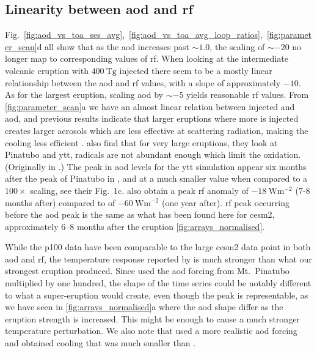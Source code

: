 \documentclass{ametsocV6.1}
\newcommand{\iso}[1][i]{{#1}njected \ce{SO2}}
\begin{document}
\subsection{Linearity between \gls{aod} and \gls{rf}}

Fig.~\ref{fig:aod_vs_toa_ses_avg},~\ref{fig:aod_vs_toa_avg_loop_ratios},~\ref{fig:parameter_scan}d
all show that as the \gls{aod} increases past \(\sim 1.0\), the scaling of \(\sim -20\)
no longer map to corresponding values of \gls{rf}. When looking at the intermediate
volcanic eruption with \(\SI{400}{\tera\gram}\) \iso{} there seem to be a mostly linear
relationship between the \gls{aod} and \gls{rf} values, with a slope of approximately
\(-10\). As for the largest eruption, scaling \gls{aod} by \(\sim-5\) yields reasonable
\gls{rf} values. From \ref{fig:parameter_scan}a we have an almost linear relation
between \iso{} and \gls{aod}, and previous results indicate that larger eruptions where
more  is injected creates larger aerosols which are less effective at scattering
radiation, making the cooling less efficient
\citep{english2013,timmreck2010,timmreck2018}. \citet{timmreck2010} also find that for
very large eruptions, they look at Pinatubo and \gls{ytt},  radicals are not
abundant enough which limit the  oxidation. (Originally in \citep{bekki1995}.)
The peak in \gls{aod} levels for the \gls{ytt} simulation appear six months after the
peak of Pinatubo in \citet{timmreck2010}, and at a much smaller value when compared to a
\(100\times\) scaling, see their Fig.\ 1c. \citet{timmreck2010} also obtain a peak
\gls{rf} anomaly of \(\SI{-18}{\watt\metre^{-2}}\) (\(7\)-\(8\) months after) compared
to \citet{jones2005} of \(\SI{-60}{\watt\metre^{-2}}\) (one year after). \gls{rf} peak
occurring before the \gls{aod} peak is the same as what has been found here for
\gls{cesm2}, approximately \(6\)--\(8\) months after the eruption
\ref{fig:arrays_normalised}.

While the \gls{p100} data have been comparable to the large \gls{cesm2} data point in
both \gls{aod} and \gls{rf}, the temperature response reported by \citet{jones2005} is
much stronger than what our strongest eruption produced. Since \citet{jones2005} used
the \gls{aod} forcing from Mt.\ Pinatubo multiplied by one hundred, the shape of the
time series could be notably different to what a super-eruption would create, even
though the peak is representable, as we have seen in \ref{fig:arrays_normalised}a where
the \gls{aod} shape differ as the eruption strength is increased. This might be enough
to cause a much stronger temperature perturbation. We also note that
\citet{timmreck2010} used a more realistic \gls{aod} forcing and obtained cooling that
was much smaller than \citet{jones2005}.
\end{document}
